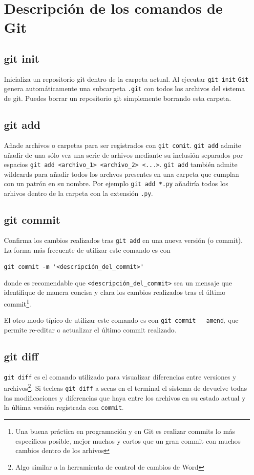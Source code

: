\documentclass[a4paper,11pt]{report}
\newcommand{\cverb}{\Verb}
\begin{document}
   \chapter{Descripción de los comandos de Git}
    \section{git init}
      Inicializa un repositorio git dentro de la carpeta actual. Al ejecutar \cverb+git init+ \verb+Git+ genera automáticamente una subcarpeta \verb+.git+ con todos los archivos del sistema de git. Puedes borrar un repositorio git simplemente borrando esta carpeta.
      
    \section{git add}
      Añade archivos o carpetas para ser registrados con \cverb+git comit+. \cverb+git add+ admite añadir de una sólo vez una serie de arhivos mediante su inclusión separados por espacios \cverb+git add <archivo_1> <archivo_2> <...>+. \cverb+git add+ también admite wildcards para añadir todos los archvos presentes en una carpeta que cumplan con un patrón en su nombre. Por ejemplo \cverb+git add *.py+ añadiría todos los arhivos dentro de la carpeta con la extensión \verb+.py+.
    
    \section{git commit}
      Confirma los cambios realizados tras \cverb+git add+ en una nueva versión (o commit). La forma más frecuente de utilizar este comando es con
      
      \cverb+git commit -m '<descripción_del_commit>'+
      
      donde es recomendable que \verb+<descripción_del_commit>+ sea un mensaje que identifique de manera concisa y clara los cambios realizados tras el último commit\footnote{Una buena práctica en programación y en Git es realizar commits lo más específicos posible, mejor muchos y cortos que un gran commit con muchos cambios dentro de los arhivos}. 
      
      El otro modo típico de utilizar este comando es con \cverb+git commit --amend+, que permite re-editar o actualizar el último commit realizado.
      
    \section{git diff}
    \cverb+git diff+ es el comando utilizado para visualizar diferencias entre versiones y archivos\footnote{Algo similar a la herramienta de control de cambios de Word}. Si tecleas \cverb+git diff+ a secas en el terminal el sistema de devuelve todas las modificaciones y diferencias que haya entre los archivos en su estado actual y la última versión registrada con \verb+commit+.
    
\end{document}
